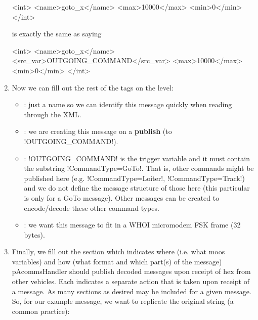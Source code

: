 \begin{enumerate}
\begin{small}
\begin{boxedverbatim}
      <int>
        <name>goto_x</name>
        <max>10000</max>
        <min>0</min>
      </int>
\end{boxedverbatim}
\resetbvlinenumber
\end{small}
is exactly the same as saying 
\begin{small}
\begin{boxedverbatim}
      <int>
        <name>goto_x</name>
        <src_var>OUTGOING_COMMAND</src_var>
        <max>10000</max>
        <min>0</min>
      </int>
\end{boxedverbatim}
\resetbvlinenumber
\end{small}

\item Now we can fill out the rest of the tags on the  level:
\begin{itemize}
\item {}: just a name so we can identify this message quickly when reading through the XML.
\item {}: we are creating this message on a \textbf{publish} (to !OUTGOING_COMMAND!).
\item {}: !OUTGOING_COMMAND! is the trigger variable and it must contain the substring !CommandType=GoTo!. That is, other commands might be published here (e.g. !CommandType=Loiter!, !CommandType=Track!) and we do not define the message structure of those here (this particular  is only for a GoTo message). Other messages can be created to encode/decode these other command types.
\item {}: we want this message to fit in a WHOI micromodem FSK frame (32 bytes).
\end{itemize}
\item Finally, we fill out the  section which indicates where (i.e. what moos variables) and how (what format and which part(s) of the message) pAcommsHandler should publish decoded messages upon receipt of hex from other vehicles. Each  indicates a separate action that is taken upon receipt of a message. As many  sections as desired may be included for a given message. So, for our example message, we want to replicate the original string (a common practice):
\begin{verbatim}

\end{verbatim}
\end{enumerate}
